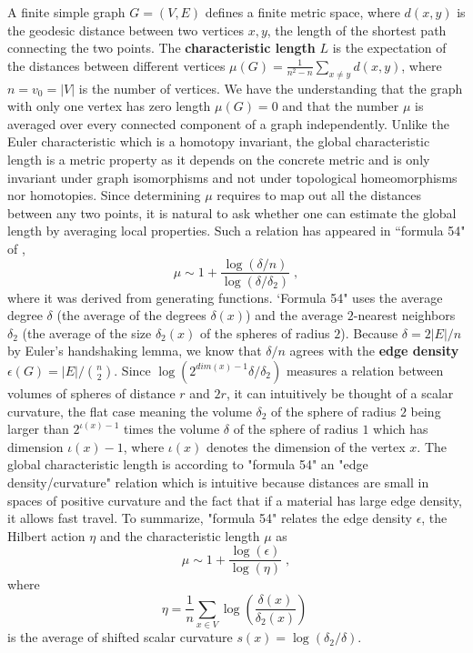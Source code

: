\documentclass[12pt]{amsart}
\theoremstyle{definition}
\def\B#1#2{{#1\choose #2}}
\begin{document}
A finite simple graph $G=(V,E)$ defines a finite metric space, where
$d(x,y)$ is the geodesic distance between two vertices $x,y$, the length of the shortest
path connecting the two points. The {\bf characteristic length} $L$ is the expectation
of the distances between different vertices
$\mu(G) =  \frac{1}{n^2-n} \sum_{x \neq y} d(x,y)$,
where $n=v_0=|V|$ is the number of vertices. We have the understanding that the graph 
with only one vertex has zero length $\mu(G)=0$ and that the number $\mu$ is averaged over every connected
component of a graph independently. Unlike the Euler characteristic which 
is a homotopy invariant, the global characteristic length is a metric property as
it  depends on the concrete metric and is only invariant under graph isomorphisms and not under topological 
homeomorphisms \cite{KnillTopology} nor homotopies. Since determining
$\mu$ requires to map out all the distances between any two points, it is natural to ask whether
one can estimate the global length by averaging local properties. Such a relation
has appeared in ``formula 54" of \cite{NewmanStrogatzWatts},
$$  \mu \sim 1+\frac{\log(\delta/n)}{\log(\delta/\delta_2)}  \; , $$ 
where it was derived from generating functions. `Formula 54"
uses the average degree $\delta$ (the average of the degrees $\delta(x)$)
and the average $2$-nearest neighbors $\delta_2$ (the average of the size $\delta_2(x)$ 
of the spheres of radius $2$). Because $\delta=2|E|/n$ by Euler's handshaking lemma, we know that $\delta/n$
agrees with the {\bf edge density} $\epsilon(G)=|E|/\B{n}{2}$. Since $\log(2^{dim(x)-1} \delta/\delta_2)$
measures a relation between volumes of spheres of distance $r$ and $2r$, it can intuitively be
thought of a scalar curvature, the flat case meaning the volume
$\delta_2$ of the sphere of radius $2$ being larger than $2^{\iota(x)-1}$ times the volume  $\delta$ of the sphere
of radius $1$ which has dimension $\iota(x)-1$, where $\iota(x)$ denotes the dimension of the vertex $x$.
The global characteristic length is according to "formula 54"
an "edge density/curvature" relation which is intuitive because distances are small 
in spaces of positive curvature and the fact that if a material has large edge density, it 
allows fast travel. To summarize, "formula 54" relates the edge density $\epsilon$, 
the Hilbert action $\eta$ and the characteristic length $\mu$ as
$$  \mu \sim 1+\frac{\log(\epsilon)}{\log(\eta)}  \; , $$ 
where 
$$ \eta = \frac{1}{n} \sum_{x \in V} \log(\frac{\delta(x)}{\delta_2(x)})  \;  $$
is the average of shifted scalar curvature $s(x) = \log(\delta_2/\delta)$. \\ 
\end{document}
